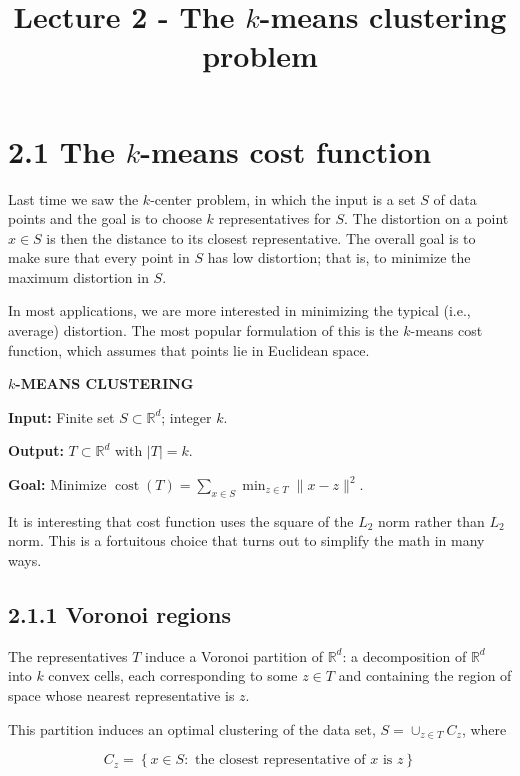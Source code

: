 \documentclass{article}
\title{Lecture 2 - The $k$-means clustering problem}
\author{}
\date{}
\begin{document}
\maketitle

\section*{2.1 The $k$-means cost function}

Last time we saw the $k$-center problem, in which the input is a set $S$ of data points and the goal is to choose $k$ representatives for $S$. The distortion on a point $x \in S$ is then the distance to its closest representative. The overall goal is to make sure that every point in $S$ has low distortion; that is, to minimize the maximum distortion in $S$.

In most applications, we are more interested in minimizing the typical (i.e., average) distortion. The most popular formulation of this is the $k$-means cost function, which assumes that points lie in Euclidean space.

\textbf{$k$-MEANS CLUSTERING}

\textbf{Input:} Finite set $S \subset \mathbb{R}^{d}$; integer $k$.

\textbf{Output:} $T \subset \mathbb{R}^{d}$ with $|T|=k$.

\textbf{Goal:} Minimize $\operatorname{cost}(T)=\sum_{x \in S} \min _{z \in T}\|x-z\|^{2}$.

It is interesting that cost function uses the square of the $L_{2}$ norm rather than $L_{2}$ norm. This is a fortuitous choice that turns out to simplify the math in many ways.

\subsection*{2.1.1 Voronoi regions}

The representatives $T$ induce a Voronoi partition of $\mathbb{R}^{d}$: a decomposition of $\mathbb{R}^{d}$ into $k$ convex cells, each corresponding to some $z \in T$ and containing the region of space whose nearest representative is $z$.

This partition induces an optimal clustering of the data set, $S=\cup_{z \in T} C_{z}$, where

\begin{equation*}
C_{z}=\left\{x \in S: \text{ the closest representative of } x \text{ is } z\right\}
\end{equation*}
\end{document}
